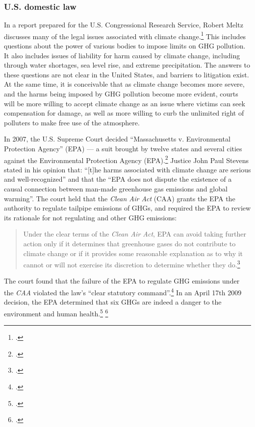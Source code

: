 		\subsubsection{U.S. domestic law}
		\label{sec:USDomesticLaw}


In a report prepared for the U.S. Congressional Research Service, Robert Meltz discusses many of the legal issues associated with climate change.\footcite[][]{ExistingLaw}
This includes questions about the power of various bodies to impose limits on GHG pollution.
It also includes issues of liability for harm caused by climate change, including through water shortages, sea level rise, and extreme precipitation.
The answers to these questions are not clear in the United States, and barriers to litigation exist.
At the same time, it is conceivable that as climate change becomes more severe, and the harms being imposed by GHG pollution become more evident, courts will be more willing to accept climate change as an issue where victims can seek compensation for damage, as well as more willing to curb the unlimited right of polluters to make free use of the atmosphere.



In 2007, the U.S. Supreme Court decided ``Massachusetts v. Environmental Protection Agency'' (EPA) --- a suit brought by twelve states and several cities against the Environmental Protection Agency (EPA).\footcite[][]{MassVEPA}
Justice John Paul Stevens stated in his opinion that: ``[t]he harms associated with climate change are serious and well-recognized'' and that the ``EPA does not dispute the existence of a causal connection between man-made greenhouse gas emissions and global warming''.
The court held that the \emph{Clean Air Act} (CAA) grants the EPA the authority to regulate tailpipe emissions of GHGs, and required the EPA to review its rationale for not regulating  and other GHG emissions:
\begin{quote}
Under the clear terms of the \emph{Clean Air Act}, EPA can avoid taking further action only if it determines that greenhouse gases do not contribute to climate change or if it provides some reasonable explanation as to why it cannot or will not exercise its discretion to determine whether they do.\footcite[][p. 30]{MassVEPA}
\end{quote}
The court found that the failure of the EPA to regulate GHG emissions under the \emph{CAA} violated the law's ``clear statutory command''.\footcite[See: ][]{EPAhaspower}
In an April 17th 2009 decision, the EPA determined that six GHGs are indeed a danger to the environment and human health.\footcite[][]{EPAEndangermentFinding} \footcite[][]{GreenFigleaf}



